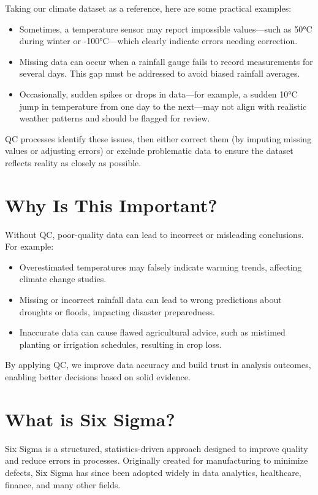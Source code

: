 Taking our climate dataset as a reference, here are some practical examples:

\begin{itemize}
  \item Sometimes, a temperature sensor may report impossible values—such as 50°C during winter or -100°C—which clearly indicate errors needing correction.
  \item Missing data can occur when a rainfall gauge fails to record measurements for several days. This gap must be addressed to avoid biased rainfall averages.
  \item Occasionally, sudden spikes or drops in data—for example, a sudden 10°C jump in temperature from one day to the next—may not align with realistic weather patterns and should be flagged for review.
\end{itemize}

QC processes identify these issues, then either correct them (by imputing missing values or adjusting errors) or exclude problematic data to ensure the dataset reflects reality as closely as possible.

\section{Why Is This Important?}

Without QC, poor-quality data can lead to incorrect or misleading conclusions. For example:

\begin{itemize}
  \item Overestimated temperatures may falsely indicate warming trends, affecting climate change studies.
  \item Missing or incorrect rainfall data can lead to wrong predictions about droughts or floods, impacting disaster preparedness.
  \item Inaccurate data can cause flawed agricultural advice, such as mistimed planting or irrigation schedules, resulting in crop loss.
\end{itemize}

By applying QC, we improve data accuracy and build trust in analysis outcomes, enabling better decisions based on solid evidence.

\section{What is Six Sigma?}

Six Sigma is a structured, statistics-driven approach designed to improve quality and reduce errors in processes. Originally created for manufacturing to minimize defects, Six Sigma has since been adopted widely in data analytics, healthcare, finance, and many other fields.

